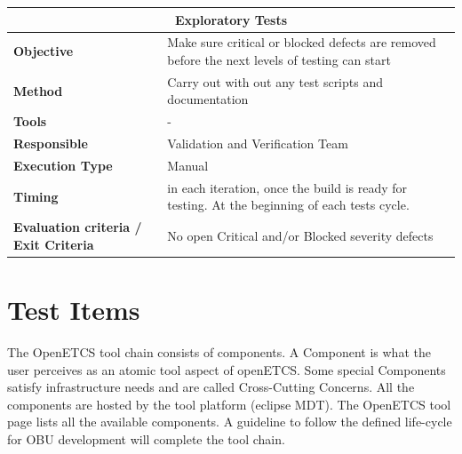 \begin{center}
\begin{longtable}[H]{|p{4cm}|p{9cm}|}\hline
\multicolumn{2}{|c|}{\textbf{Exploratory Tests}}\\\hline
\textbf{Objective} &  Make sure critical or blocked defects are removed before the next levels of testing can start\\\hline
\textbf{Method} & Carry out with out any test scripts and documentation \\\hline
\textbf{Tools} & -\\\hline
\textbf{Responsible} & Validation and Verification Team\\\hline
\textbf{Execution Type} & Manual\\\hline
\textbf{Timing} & in each iteration, once the build is ready for testing. At the beginning of each tests cycle.  \\\hline
\textbf{Evaluation criteria / Exit Criteria} & No open Critical and/or Blocked severity defects \\\hline
\end{longtable}
\end{center}


\section{Test Items}
\label{sec:test_items}
The OpenETCS tool chain consists of components. A Component is what the user perceives as an atomic tool aspect of openETCS. Some special Components satisfy infrastructure needs and are called Cross-Cutting Concerns. All the components are hosted by the tool platform (eclipse MDT). The OpenETCS tool page lists all the available components. A guideline to follow the defined life-cycle for OBU development will complete the tool chain.

